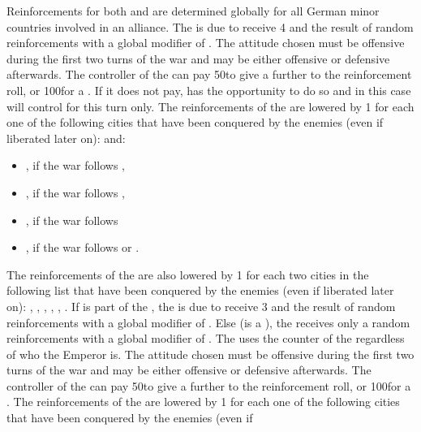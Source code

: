 \begin{digressions}
  \phadm
  \aparag Reinforcements for both \alliance and \ligue are determined globally
  for all German minor countries involved in an alliance.
  \aparag The \alliance is due to receive 4 \LD and the result of random
  reinforcements with a global modifier of .
  \bparag The attitude chosen must be offensive during the first two turns of
  the war and may be either offensive or defensive afterwards.
  \aparag The controller of the \alliance can pay 50\ducats to give a further
   to the reinforcement roll, or 100\ducats for a . If it
  does not pay, \SUE has the opportunity to do so and in this case will
  control \alliance for this turn only.
  \aparag The reinforcements of the \alliance are lowered by 1 \LD for each
  one of the following cities that have been conquered by the enemies (even if
  liberated later on): \villeMagdeburg and:
  \begin{itemize}
  \item \villeStuttgart, \villeErfurt if the war follows
    ,
  \item \villeMunster, \villeRostock if the war follows ,
  \item \villeSpeyer, \villePrague if the war follows 
  \item \villeFrankfurt, \villeErfurt if the war follows
     or .
  \end{itemize}
  \aparag The reinforcements of the \alliance are also lowered by 1 \LD for
  each two cities in the following list that have been conquered by the
  enemies (even if liberated later on): \villeHannover, \villeCassel,
  \villeDresden, \villeBerlin, \villeLubeck, \villeHamburg.
  \aparag If \AUSmin is part of the \ligue, the \ligue is due to receive 3 \LD
  and the result of random reinforcements with a global modifier of
  . Else (\AUS is a \MAJ), the \ligue receives only a random
  reinforcements with a global modifier of .  The \ligue uses the
  \ARMY counter of the \HRE regardless of who the Emperor is.
  \bparag The attitude chosen must be offensive during the first two turns of
  the war and may be either offensive or defensive afterwards.
  \aparag The controller of the \ligue can pay 50\ducats to give a further
   to the reinforcement roll, or 100\ducats for a .
  \aparag The reinforcements of the \ligue are lowered by 1 \LD for each one
  of the following cities that have been conquered by the enemies (even if

\end{digressions}
